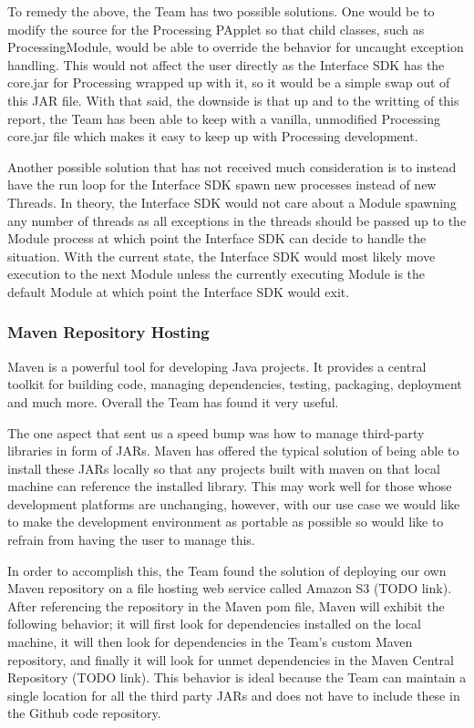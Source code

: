 \documentclass[11pt,letterpaper]{article}
\begin{document}
	To remedy the above, the Team has two possible solutions. One would be to
	modify the source for the Processing PApplet so that child classes, such as
	ProcessingModule, would be able to override the behavior for uncaught exception
	handling. This would not affect the user directly as the Interface SDK has the
	core.jar for Processing wrapped up with it, so it would be a simple swap out
	of this JAR file. With that said, the downside is that up and to the writting
	of this report, the Team has been able to keep with a vanilla, unmodified
	Processing core.jar file which makes it easy to keep up with Processing
	development. 

	Another possible solution that has not received much consideration is to
	instead have the run loop for the Interface SDK spawn new processes instead of
	new Threads.  In theory, the Interface SDK would not care about a Module
	spawning any number of threads as all exceptions in the threads should be
	passed up to the Module process at which point the Interface SDK can decide to
	handle the situation. With the current state, the Interface SDK would most
	likely move execution to the next Module unless the currently executing Module
	is the default Module at which point the Interface SDK would exit.

	\subsubsection{Maven Repository Hosting}
	\label{sec:cont_dev_maven_repo}
	Maven is a powerful tool for developing Java projects.  It provides a central
	toolkit for building code, managing dependencies, testing, packaging,
	deployment and much more.  Overall the Team has found it very useful. 

	The one aspect that sent us a speed bump was how to manage third-party
	libraries in form of JARs. Maven has offered the typical solution of being
	able to install these JARs locally so that any projects built with maven on
	that local machine can reference the installed library.  This may work well
	for those whose development platforms are unchanging, however, with our use
	case we would like to make the development environment as portable as possible
	so would like to refrain from having the user to manage this. 

	In order to accomplish this, the Team found the solution of deploying our own
	Maven repository on a file hosting web service called Amazon S3 (TODO link).
	After referencing the repository in the Maven pom file, Maven will exhibit the
	following behavior; it will first look for dependencies installed on the local
	machine, it will then look for dependencies in the Team's custom Maven
	repository, and finally it will look for unmet dependencies in the Maven
	Central Repository (TODO link). This behavior is ideal because the Team can
	maintain a single location for all the third party JARs and does not have to
	include these in the Github code repository. 
\end{document}
